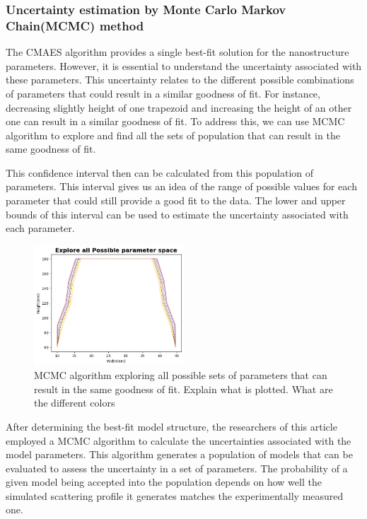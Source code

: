 \subsubsection{Uncertainty estimation by Monte Carlo Markov Chain(MCMC) method}
\label{sec:mcmc_cd-saxs}

The CMAES algorithm provides a single best-fit solution for the nanostructure parameters. However, it is essential to understand the uncertainty associated with these parameters.
This uncertainty relates to the different possible combinations of parameters that could result in a similar goodness of fit. 
For instance, decreasing slightly height of one trapezoid and increasing the height of an other one can result in a similar goodness of fit.
To address this, we can use MCMC algorithm to explore and find all the sets of population that can result in the same goodness of fit.

\medskip

This confidence interval then can be calculated from this population of parameters. This interval gives us an idea of the range of possible values for each parameter that could still provide a good fit to the data.
The lower and upper bounds of this interval can be used to estimate the uncertainty associated with each parameter.

\begin{figure}[h]
    \centering
    \includegraphics[width=0.5\textwidth]{images/mcmc.png}
    \caption{MCMC algorithm exploring all possible sets of parameters that can result in the same goodness of fit.
    \color{red} Explain what is plotted. What are the different colors \color{black}
}
\end{figure}
\medskip



After determining the best-fit model structure, the researchers of this article \cite{sunday2016evaluation}
employed a MCMC algorithm to calculate the uncertainties associated with the model parameters.
This algorithm generates a population of models that can be evaluated to assess the uncertainty
in a set of parameters. The probability of a given model being accepted into the population
depends on how well the simulated scattering profile it generates matches the experimentally
measured one.

